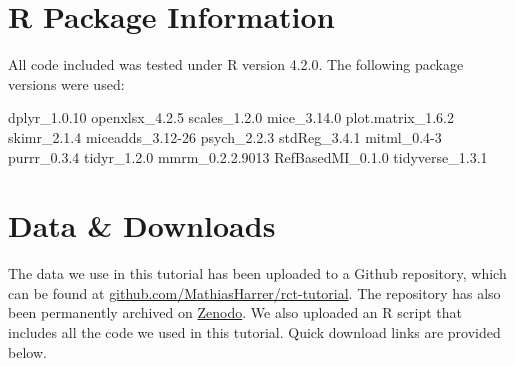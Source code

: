 \section{\textsf{R} Package Information}

\vspace{-2mm}

All code included was tested under \textsf{R} version 4.2.0. The following package versions were used:

\begin{example}
    dplyr_1.0.10        openxlsx_4.2.5      scales_1.2.0  
    mice_3.14.0         plot.matrix_1.6.2   skimr_2.1.4  
    miceadds_3.12-26    psych_2.2.3         stdReg_3.4.1  
    mitml_0.4-3         purrr_0.3.4         tidyr_1.2.0       
    mmrm_0.2.2.9013     RefBasedMI_0.1.0    tidyverse_1.3.1 
\end{example}


\section{Data \& Downloads}

\vspace{-2mm}

\textsf{ }

\vspace{2mm}

\hspace*{-7mm} The data we use in this tutorial has been uploaded to a Github repository, which can be found at \href{https://github.com/MathiasHarrer/rct-tutorial}{github.com/MathiasHarrer/rct-tutorial}. The repository has also been permanently archived on \href{https://doi.org/10.5281/zenodo.7757478}{Zenodo}. We also uploaded an \textsf{R} script that includes all the code we used in this tutorial. Quick download links are provided below.



